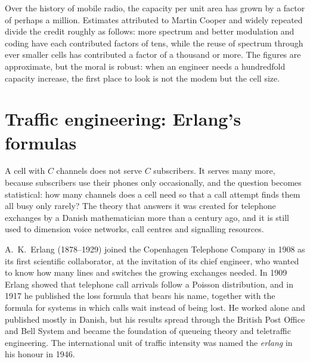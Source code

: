 \begin{keyidea}
Over the history of mobile radio, the capacity per unit area has grown by a factor of perhaps a million. Estimates
attributed to Martin Cooper and widely repeated divide the credit roughly as follows: more spectrum and better
modulation and coding have each contributed factors of tens, while the reuse of spectrum through ever smaller cells
has contributed a factor of a thousand or more. The figures are approximate, but the moral is robust: when an
engineer needs a hundredfold capacity increase, the first place to look is not the modem but the cell size.
\end{keyidea}

\section{Traffic engineering: Erlang's formulas}
\label{sec:ch20:traffic}

A cell with $C$ channels does not serve $C$ subscribers. It serves many more, because subscribers use their
phones only occasionally, and the question becomes statistical: how many channels does a cell need so that a call
attempt finds them all busy only rarely? The theory that answers it was created for telephone exchanges by a
Danish mathematician more than a century ago, and it is still used to dimension voice networks, call centres and
signalling resources.


\begin{history}
A.~K.~Erlang (1878--1929) joined the Copenhagen Telephone Company in 1908 as its first scientific collaborator, at
the invitation of its chief engineer, who wanted to know how many lines and switches the growing exchanges needed.
In 1909 Erlang showed that telephone call arrivals follow a Poisson distribution, and in 1917 he published the
loss formula that bears his name, together with the formula for systems in which calls wait instead of being lost.
He worked alone and published mostly in Danish, but his results spread through the British Post Office and Bell
System and became the foundation of queueing theory and teletraffic engineering. The international unit of
traffic intensity was named the \emph{erlang} in his honour in 1946.
\end{history}


